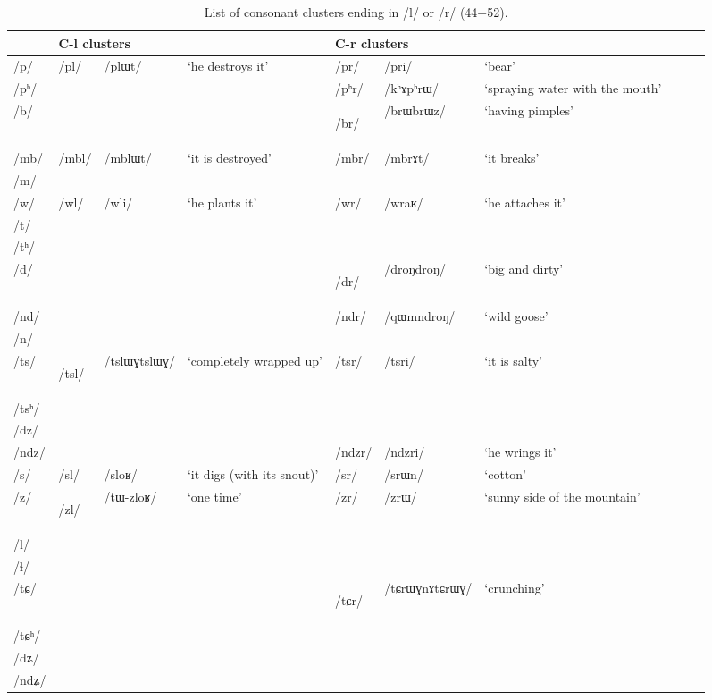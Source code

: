 \documentclass[12pt]{article}
\newcommand{\ipa}[1]{\mbox{\phon/#1/}}
\newcommand{\ipab}[1]{{\phon#1}}
\newcommand{\deux}[1]{\ipa{#1}\addtocounter{2clusters}{1}}
\newcommand{\tib}[1]{\cellcolor{lightgray}\textbf{#1}}
\newcommand{\idph}[1]{\cellcolor{gray}\textbf{#1}}
\begin{document}
  \begin{landscape}
 \begin{longtable}{llllllllll}
 \caption{List of consonant clusters ending in \ipa{l} or \ipa{r} (44+52).} \label{med.l.r} \\
\toprule
 & \multicolumn{3}{l}{C-\ipab{l} clusters} & \multicolumn{3}{l}{C-\ipab{r} clusters}   \\
\midrule
  \ipa{p} & \deux{pl} & \ipa{plɯt} & `he destroys it' & \deux{pr} & \ipa{pri} & `bear' \\ 
\ipa{pʰ} & & & & \deux{pʰr} & \ipa{kʰɤpʰrɯ} & `spraying water with the mouth' \\ 
\ipa{b} & & & & \deux{br} \idph{} & \ipa{brɯbrɯz} & `having pimples' \\ 
\ipa{mb} & \deux{mbl} & \ipa{mblɯt} & `it is destroyed' & \deux{mbr} & \ipa{mbrɤt} & `it breaks' \\ 
\ipa{m} & & & & & & \\ 
\ipa{w} & \deux{wl} & \ipa{wli} & `he plants it' & \deux{wr} & \ipa{wraʁ} & `he attaches it' \\ 
\ipa{t} & & & & & & \\ 
\ipa{tʰ} & & & & & & \\ 
\ipa{d} & & & & \deux{dr} \idph{} & \ipa{droŋdroŋ} & `big and dirty' \\ 
\ipa{nd} & & & & \deux{ndr} & \ipa{qɯmndroŋ} & `wild goose' \\ 
\ipa{n} & & & & & & \\ 
\ipa{ts} & \deux{tsl}\idph{} & \ipa{tslɯɣtslɯɣ} & `completely wrapped up' & \deux{tsr} & \ipa{tsri} & `it is salty' \\ 
\ipa{tsʰ} & & & & & & \\ 
\ipa{dz} & & & & & & \\ 
\ipa{ndz} & & & & \deux{ndzr} & \ipa{ndzri} & `he wrings it' \\ 
\ipa{s} & \deux{sl} & \ipa{sloʁ} & `it digs (with its snout)' & \deux{sr} & \ipa{srɯn} & `cotton' \\ 
\ipa{z} & \deux{zl} \tib{} & \ipa{tɯ-zloʁ} & `one time' & \deux{zr} & \ipa{zrɯ} & `sunny side of the mountain' \\ 
\ipa{l} & & & & & & \\ 
\ipa{ɬ} & & & & & & \\ 
\ipa{tɕ} & & & & \deux{tɕr} \idph{} & \ipa{tɕrɯɣnɤtɕrɯɣ} & `crunching' \\ 
\ipa{tɕʰ} & & & & & & \\ 
\ipa{dʑ} & & & & & & \\ 
\ipa{ndʑ} & & & & & & \\ 

\end{longtable}
\end{landscape}
\end{document}
